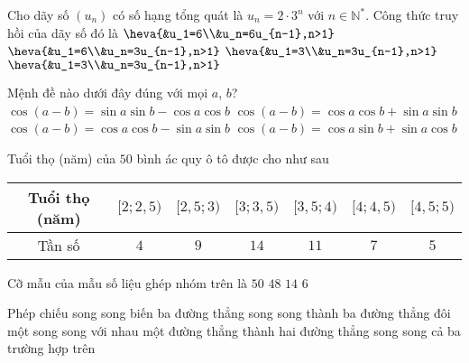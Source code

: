 \begin{ex}%
Cho dãy số $\left(u_n\right)$ có số hạng tổng quát là $u_{n}=2\cdot3^n$ với $n\in\mathbb{N^*}$. Công thức truy hồi của dãy số đó là
\choice
{$\heva{&u_1=6\\&u_n=6u_{n-1},n>1}$}
{\True $\heva{&u_1=6\\&u_n=3u_{n-1},n>1}$}
{$\heva{&u_1=3\\&u_n=3u_{n-1},n>1}$}
{$\heva{&u_1=3\\&u_n=3u_{n-1},n>1}$}
\end{ex}

\begin{ex}%
Mệnh đề nào dưới đây đúng với mọi $a$, $b$?
\choice
{$\cos{\left(a - b \right)} = \sin{a} \sin{b} - \cos{a}\cos{b}$}
{\True $\cos{\left(a - b \right)} = \cos{a}\cos{b} + \sin{a} \sin{b}$}
{$\cos{\left(a - b \right)} = \cos{a}\cos{b} - \sin{a} \sin{b}$}
{$\cos{\left(a - b \right)} = \cos{a}\sin{b} + \sin{a} \cos{b}$}
\end{ex}

\begin{ex}%
Tuổi thọ (năm) của $50$ bình ác quy ô tô được cho như sau
\begin{center}
\begin{tabular}{|c|c|c|c|c|c|c|}
\hline
Tuổi thọ (năm)  & $[2;2{,}5)$ & $[2{,}5;3)$ & $[3;3{,}5)$ & $[3{,}5;4)$ & $[4;4{,}5)$ & $[4{,}5;5)$ \\
\hline
Tần số  & $4$ & $9$ & $14$ & $11$ & $7$ & $5$ \\
\hline
\end{tabular}
\end{center}
Cỡ mẫu của mẫu số liệu ghép nhóm trên là
\choice
{\True $50$}
{$48$}
{$14$}
{$6$}
\end{ex}

\begin{ex}%
Phép chiếu song song biến ba đường thẳng song song thành
\choice
{ba đường thẳng đôi một song song với nhau}
{một đường thẳng}
{thành hai đường thẳng song song}
{\True cả ba trường hợp trên}
\end{ex}

